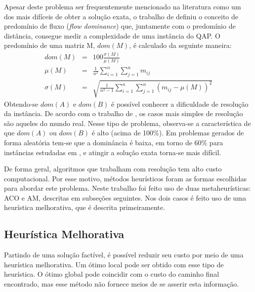 Apesar deste problema ser frequentemente mencionado na literatura como
um dos mais difíceis de obter a solução exata, o trabalho de
\cite{dominance} definiu o conceito de predomínio de fluxo
(\textit{flow dominance}) que, juntamente com o predomínio de
distância, consegue medir a complexidade de uma instância do QAP. O
predomínio de uma matriz M, $dom(M)$, é calculado da seguinte maneira:
\begin{eqnarray}
dom(M) &=& 100 \frac{\sigma(M)}{\mu(M)} \\
\mu(M) &=& \frac{1}{n^2} \sum_{i=1}^n \sum_{j=1}^n m_{ij} \nonumber \\
\sigma(M) &=& \sqrt{\frac{1}{n^2 - 1} \sum_{i=1}^n \sum_{j=1}^n
(m_{ij} - \mu(M))^2} \nonumber
\end{eqnarray}
Obtendo-se $dom(A)$ e $dom(B)$ é possível conhecer a dificuldade de
resolução da instância. De acordo com o trabalho de \cite{taillard1},
os casos mais simples de resolução são aqueles do mundo real. Nesse
tipo de problema, observa-se a característica de que $dom(A)$ ou
$dom(B)$ é alto (acima de 100\%). Em problemas gerados de forma
aleatória tem-se que a dominância é baixa, em torno de 60\% para
instâncias estudadas em \cite{taillard1}, e atingir a solução exata
torna-se mais difícil.

De forma geral, algoritmos que trabalham com resolução tem alto custo
computacional. Por esse motivo, métodos heurísticos foram as formas
escolhidas para abordar este problema. Neste trabalho foi feito uso de
duas metaheurísticas: ACO e AM, descritas em subseções seguintes.
Nos dois casos é feito uso de uma heurística melhorativa, que é
descrita primeiramente.


\subsection{Heurística Melhorativa}
\label{sub:hm}

Partindo de uma solução factível, é possível reduzir seu custo por
meio de uma heurística melhorativa. Um ótimo local pode ser obtido com
esse tipo de heurística. O ótimo global pode coincidir com o custo do
caminho final encontrado, mas esse método não fornece meios de se
asserir esta informação.

